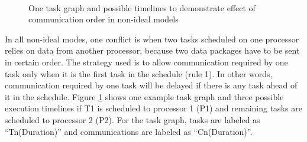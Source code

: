 \documentclass[msc,deptreport, cs]{infthesis}
\begin{document}
\begin{figure}[htpb]
  \centering
  \vspace{1em}
  \hspace{3em}
   \hspace{4em}
   \\
   \hspace{1em}
  \caption{One task graph and possible timelines to demonstrate effect of communication order in non-ideal models}
  \label{fig:conflict1}
\end{figure}

In all non-ideal modes, one conflict is when two tasks scheduled on one processor relies on data from another processor, because two data packages have to be sent in certain order. The strategy used is to allow communication required by one task only when it is the first task in the schedule (rule 1). In other words, communication required by one task will be delayed if there is any task ahead of it in the schedule. Figure \ref{fig:conflict1} shows one example task graph and three possible execution timelines if T1 is scheduled to processor 1 (P1) and remaining tasks are scheduled to processor 2 (P2). For the task graph, tasks are labeled as ``Tn(Duration)'' and communications are labeled as ``Cn(Duration)''.
\end{document}
